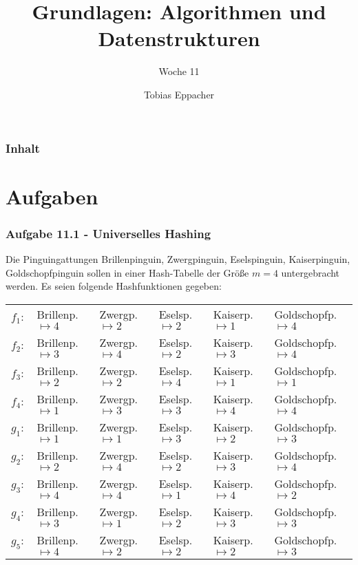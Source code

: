 \documentclass{beamer}
\title{Grundlagen: Algorithmen und Datenstrukturen}
\author{Tobias Eppacher}
\date{\presdatum}
\institute{School of Computation, Information and Technology}
\subtitle{Woche 11}
\begin{document}
\begin{frame}
	\titlepage
\end{frame}

\begin{frame}
	\frametitle{Inhalt}
	\tableofcontents[subsectionstyle=hide]
\end{frame}

\section{Aufgaben}

\begin{frame}
	\frametitle{Aufgabe 11.1 - Universelles Hashing}

	\small
	Die Pinguingattungen {Brillenpinguin, Zwergpinguin, Eselspinguin, Kaiserpinguin, Goldschopfpinguin}
	sollen in einer Hash-Tabelle der Größe $m = 4$ untergebracht werden. Es seien folgende Hashfunktionen gegeben:

	\begin{table}
		\tiny
		\centering
		\begin{tabular}{llllll}
			$f_1:$ & Brillenp. $\mapsto 4$ & Zwergp. $\mapsto 2$ & Eselsp. $\mapsto 2$ & Kaiserp. $\mapsto 1$ & Goldschopfp. $\mapsto 4$ \\
			$f_2:$ & Brillenp. $\mapsto 3$ & Zwergp. $\mapsto 4$ & Eselsp. $\mapsto 2$ & Kaiserp. $\mapsto 3$ & Goldschopfp. $\mapsto 4$ \\
			$f_3:$ & Brillenp. $\mapsto 2$ & Zwergp. $\mapsto 2$ & Eselsp. $\mapsto 4$ & Kaiserp. $\mapsto 1$ & Goldschopfp. $\mapsto 1$ \\
			$f_4:$ & Brillenp. $\mapsto 1$ & Zwergp. $\mapsto 3$ & Eselsp. $\mapsto 3$ & Kaiserp. $\mapsto 4$ & Goldschopfp. $\mapsto 4$ \\
			\hline\hline
			$g_1:$ & Brillenp. $\mapsto 1$ & Zwergp. $\mapsto 1$ & Eselsp. $\mapsto 3$ & Kaiserp. $\mapsto 2$ & Goldschopfp. $\mapsto 3$ \\
			$g_2:$ & Brillenp. $\mapsto 2$ & Zwergp. $\mapsto 4$ & Eselsp. $\mapsto 2$ & Kaiserp. $\mapsto 3$ & Goldschopfp. $\mapsto 4$ \\
			$g_3:$ & Brillenp. $\mapsto 4$ & Zwergp. $\mapsto 4$ & Eselsp. $\mapsto 1$ & Kaiserp. $\mapsto 4$ & Goldschopfp. $\mapsto 2$ \\
			$g_4:$ & Brillenp. $\mapsto 3$ & Zwergp. $\mapsto 1$ & Eselsp. $\mapsto 2$ & Kaiserp. $\mapsto 3$ & Goldschopfp. $\mapsto 3$ \\
			$g_5:$ & Brillenp. $\mapsto 4$ & Zwergp. $\mapsto 2$ & Eselsp. $\mapsto 2$ & Kaiserp. $\mapsto 2$ & Goldschopfp. $\mapsto 3$ \\
		\end{tabular}
	\end{table}


\end{frame}
\end{document}
